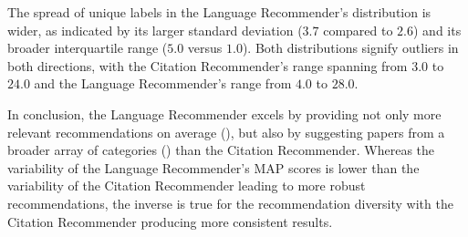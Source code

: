 The spread of unique labels in the Language Recommender's distribution is wider, as indicated by its larger standard deviation ($3.7$ compared to $2.6$)
and its broader interquartile range ($5.0$ versus $1.0$). Both distributions signify outliers in both directions, with the Citation Recommender's range spanning from $3.0$ to $24.0$ and the Language Recommender's range from $4.0$ to $28.0$.

In conclusion, the Language Recommender excels by providing not only more relevant recommendations on average (), but also by suggesting papers from a broader array of categories () than the Citation Recommender.
Whereas the variability of the Language Recommender's \ac{MAP} scores is lower than the variability of the Citation Recommender leading to more robust recommendations, the inverse is true for the recommendation diversity with the Citation Recommender producing more consistent results.
